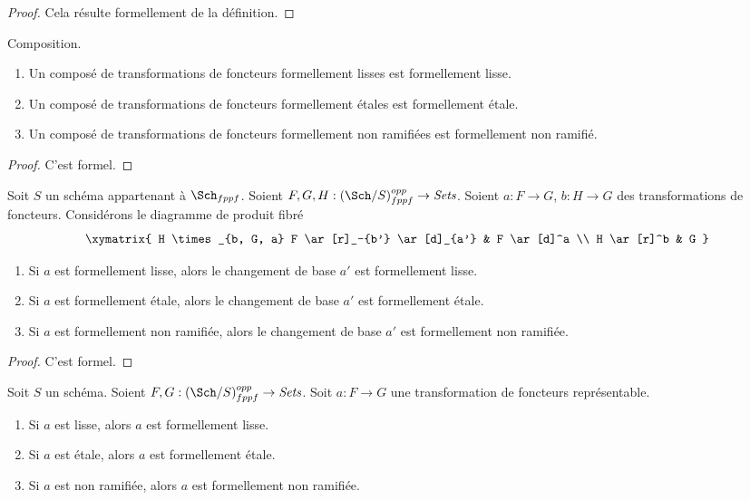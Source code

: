 \begin{proof}
Cela résulte formellement de la définition.
\end{proof}

\begin{lemma}
\label{lemma-composition-formally-smooth-etale-unramified}
Composition.
\begin{enumerate}
\item Un composé de transformations de foncteurs formellement lisses est formellement
lisse.
\item Un composé de transformations de foncteurs formellement étales est formellement
étale.
\item Un composé de transformations de foncteurs formellement non ramifiées est
formellement non ramifié.
\end{enumerate}
\end{lemma}

\begin{proof}
C'est formel.
\end{proof}

\begin{lemma}
\label{lemma-base-change-formally-smooth-etale-unramified}
Soit $S$ un schéma appartenant à $\Sch_{fppf}$.
Soient $F, G, H : (\Sch/S)_{fppf}^{opp} \to \textit{Sets}$.
Soient $a : F \to G$, $b : H \to G$ des transformations de foncteurs.
Considérons le diagramme de produit fibré
$$
\xymatrix{
H \times_{b, G, a} F \ar[r]_-{b'} \ar[d]_{a'} & F \ar[d]^a \\
H \ar[r]^b & G
}
$$
\begin{enumerate}
\item Si $a$ est formellement lisse, alors le changement de base $a'$ est
formellement lisse.
\item Si $a$ est formellement étale, alors le changement de base $a'$ est
formellement étale.
\item Si $a$ est formellement non ramifiée, alors le changement de base $a'$ est
formellement non ramifiée.
\end{enumerate}
\end{lemma}

\begin{proof}
C'est formel.
\end{proof}

\begin{lemma}
\label{lemma-representable-property-formally-property}
Soit $S$ un schéma.
Soient $F, G : (\Sch/S)_{fppf}^{opp} \to \textit{Sets}$.
Soit $a : F \to G$ une transformation de foncteurs représentable.
\begin{enumerate}
\item Si $a$ est lisse, alors $a$ est formellement lisse.
\item Si $a$ est étale, alors $a$ est formellement étale.
\item Si $a$ est non ramifiée, alors $a$ est formellement non ramifiée.
\end{enumerate}
\end{lemma}


